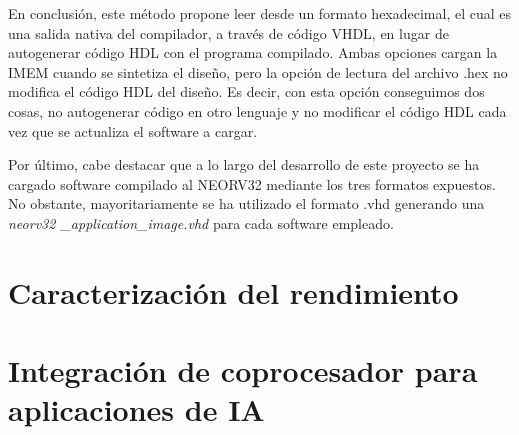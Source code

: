 En conclusión, este método propone leer desde un formato hexadecimal, el cual es una salida nativa del compilador, 
a través de código VHDL, en lugar de autogenerar código HDL con el programa compilado. 
Ambas opciones cargan la IMEM cuando se sintetiza el diseño, pero la opción de lectura del archivo .hex no modifica el código HDL del diseño. 
Es decir, con esta opción conseguimos dos cosas, no autogenerar código en otro lenguaje y no modificar el código HDL cada vez que se actualiza el software a cargar.

Por último, cabe destacar que a lo largo del desarrollo de este proyecto se ha cargado software compilado al NEORV32 mediante los tres formatos expuestos.
No obstante, mayoritariamente se ha utilizado el formato .vhd generando una \textit{neorv32   \_application\_image.vhd} para cada software empleado.

\section{Caracterización del rendimiento}

\label{Carac}

\section{Integración de coprocesador para aplicaciones de IA}

\label{Integ}


